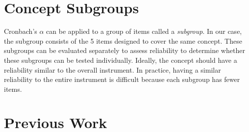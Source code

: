 \section{Concept Subgroups}

Cronbach's $\alpha$ can be applied to a group of items called a \textit{subgroup}. In our case, the subgroup consists of the 5 items designed to cover the same concept. These subgroups can be evaluated separately to assess reliability to determine whether these subgroups can be tested individually. Ideally, the concept should have a reliability similar to the overall instrument. In practice, having a similar reliability to the entire instrument is difficult because each subgroup has fewer items. 


\iflong

\section{Previous Work}


\fi